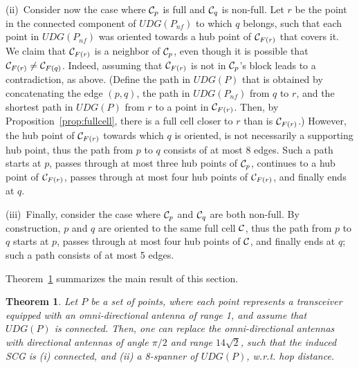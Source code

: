 \documentclass[11pt,letter]{article}
\newtheorem{theorem}{Theorem}[section]
\newcommand{\old}[1]{{{}}}
\def\clst#1{{\C_{{{F}}({{#1}})}}}
\def\C{{\cal{C}}}
\def\UDG{{U\!DG}}
\def\nf{{n\!f}}
\begin{document}
(ii)~Consider now the case where $\C_p$ is full and $\C_q$ is non-full.
Let $r$ be the point in the connected component of $\UDG(P_{\nf})$ to which $q$ belongs, such that each point in $\UDG(P_{\nf})$ was oriented towards a hub point of $\clst{r}$ that covers it. We claim that $\clst{r}$ is a neighbor of $\C_p$, even though it is possible that $\clst{r} \ne \clst{q}$.
Indeed, assuming that $\clst{r}$ is not in $\C_p$'s block leads to a contradiction, as above. (Define the path in $\UDG(P)$ that is obtained by concatenating the edge $(p,q)$, the path in $\UDG(P_{\nf})$ from $q$ to $r$, and the shortest path in $\UDG(P)$ from $r$ to a point in $\clst{r}$. Then, by Proposition~\ref{prop:fullcell}, there is a full cell closer to $r$ than is $\clst{r}$.)
However, the hub point of $\clst{r}$ towards which $q$ is oriented, is not necessarily a supporting hub point,
thus the path from $p$ to $q$ consists of at most 8 edges.
Such a path starts at $p$,
passes through at most three hub points of $\C_p$,
continues to a hub point of $\clst{r}$, passes through at most four hub points of $\clst{r}$,
and finally ends at $q$.

(iii)~Finally, consider the case where $\C_p$ and $\C_q$ are both non-full.
By construction, $p$ and $q$ are oriented to the same full cell $\C$,
thus the path from $p$ to $q$ starts at $p$,
passes through at most four hub points of $\C$, and finally ends at $q$;
such a path consists of at most 5 edges.




Theorem~\ref{thm:replacing_summary} summarizes the main result of this section.
\begin{theorem}
\label{thm:replacing_summary}
Let $P$ be a set of points, where each point represents a transceiver equipped with an omni-directional antenna of range 1,
and assume that $\UDG(P)$ is connected.
Then, one can replace the omni-directional antennas with directional antennas of angle $\pi/2$ and range $14 \sqrt{2}$,
such that the induced SCG is (i) connected, and (ii) a 8-spanner of $\UDG(P)$, w.r.t. hop distance.
\end{theorem}



\old{
\begin{figure}[htb]
 \centering
 \subfigure[]{
    \centering
      \texttt{[image: fig/hopspanner6]}
        \label{fig:hopspanner6}
   }
   \subfigure[]{
     \centering
     \texttt{[image: fig/hopspanner5]}
     \label{fig:hopspanner5}
    }
    \subfigure[]{
     \centering
     \texttt{[image: fig/hopspanner4]}
     \label{fig:hopspanner4}
    }
    \caption{$8$-hop distance}
\end{figure}
}
\end{document}
